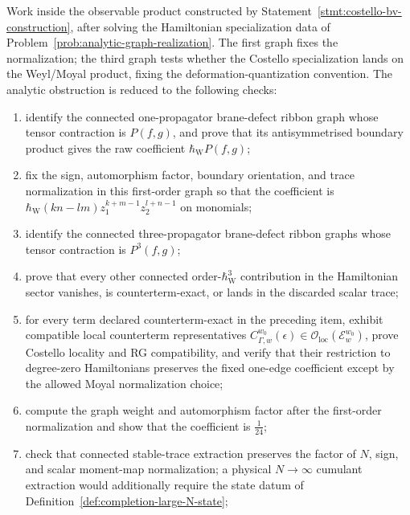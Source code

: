 \documentclass[11pt]{memoir}
\begin{document}
\begin{prob}\label{prob:first-third-graph-normalizations}
	  Work inside the observable product constructed by
  Statement~\ref{stmt:costello-bv-construction}, after solving the Hamiltonian
  specialization data of Problem~\ref{prob:analytic-graph-realization}. The
  first graph fixes the normalization; the third graph tests whether the
  Costello specialization lands on the Weyl/Moyal product, fixing the
  deformation-quantization convention. The analytic obstruction is reduced
  to the following checks:
  \begin{enumerate}
    \item identify the connected one-propagator brane-defect ribbon graph whose
      tensor contraction is $P(f,g)$, and prove that its antisymmetrised
      boundary product gives the raw coefficient
	      \(\hbar_{\mathrm{W}} P(f,g)\);
    \item fix the sign, automorphism factor, boundary orientation, and trace
      normalization in this first-order graph so that the coefficient is
	      \(\hbar_{\mathrm{W}}(kn-lm)z_1^{k+m-1}z_2^{l+n-1}\) on monomials;
    \item identify the connected three-propagator brane-defect ribbon graphs
      whose tensor contraction is $P^3(f,g)$;
		    \item prove that every other connected order-\(\hbar_{\mathrm{W}}^3\) contribution in the
	      Hamiltonian sector vanishes, is counterterm-exact, or lands in the
	      discarded scalar trace;
	    \item for every term declared counterterm-exact in the preceding item,
	      exhibit compatible local counterterm representatives
	      \(C_{\Gamma,w}^{w_0}(\epsilon)\in
	      \mathcal O_{\mathrm{loc}}(\mathcal E_w^{w_0})\), prove Costello
	      locality and RG compatibility, and verify that their restriction to
	      degree-zero Hamiltonians preserves the fixed one-edge coefficient
	      except by the allowed Moyal normalization choice;
	    \item compute the graph weight and automorphism factor after the
	      first-order normalization and show that the coefficient is
	      $\frac1{24}$;
	    \item check that connected stable-trace extraction preserves the
	      factor of \(N\), sign, and scalar moment-map normalization; a
	      physical \(N\to\infty\) cumulant extraction would additionally require
	      the state datum of
	      Definition~\ref{def:completion-large-N-state};

\end{enumerate}
\end{prob}
\end{document}
